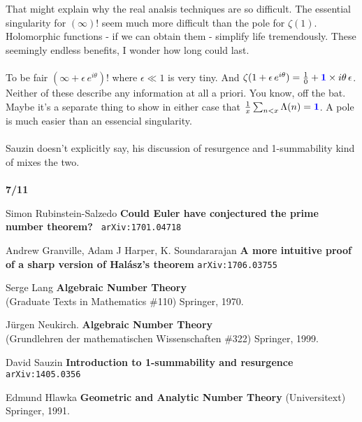 \documentclass[12pt]{article}
\begin{document}
\newpage

\noindent That might explain why the real analsis techniques are so difficult. The essential singularity for $(\infty)!$ seem much more difficult than the pole for $\zeta(1)$.  Holomorphic functions - if we can obtain them - simplify life tremendously. These seemingly endless benefits, I wonder how long could last. \\ \\
To be fair $(\infty + \epsilon  \, e^{i\theta})!$ where $\epsilon \ll 1$ is very tiny.  And $\zeta(1 + \epsilon  \, e^{i\theta} ) = \frac{1}{0} +  {\color{blue}\mathbf{1}}\times i \theta \,\epsilon $.  Neither of these describe any information at all a priori.  You know, off the bat.  Maybe it's a separate thing to show in either case 
that $\frac{1}{x} \sum_{n < x} \Lambda(n) = {\color{blue}\mathbf{1}}$. A pole is much easier than an essencial singularity. \\ \\
Sauzin doesn't explicitly say, his discussion of resurgence and 1-summability kind of mixes the two. \\ \\
\textbf{7/11}

\vfill


\begin{thebibliography}{}

\item Simon Rubinstein-Salzedo \textbf{Could Euler have conjectured the prime number theorem?} \texttt{ arXiv:1701.04718}
\item Andrew Granville, Adam J Harper, K. Soundararajan \textbf{A more intuitive proof of a sharp version of Hal\'{a}sz's theorem} \texttt{arXiv:1706.03755}

\item Serge Lang \textbf{Algebraic Number Theory} \\
(Graduate Texts in Mathematics \#110) Springer, 1970.

\item J\"{u}rgen Neukirch. \textbf{Algebraic Number Theory} \\ (Grundlehren der mathematischen Wissenschaften \#322) Springer, 1999.

\item David Sauzin \textbf{Introduction to 1-summability and resurgence} \texttt{arXiv:1405.0356}

\item Edmund Hlawka \textbf{Geometric and Analytic Number Theory} (Universitext) Springer, 1991.

\end{thebibliography}
\end{document}
